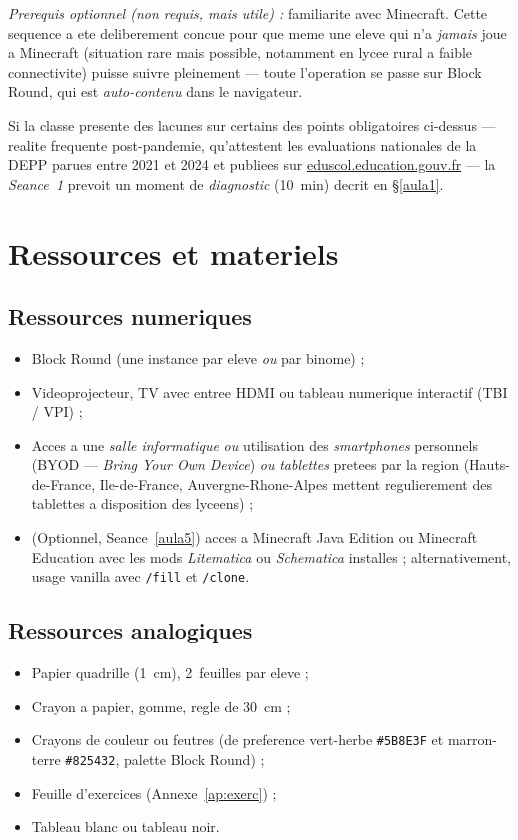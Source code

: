 \documentclass[12pt,a4paper]{scrartcl}
\newcommand{\cmd}[1]{\textcolor{earth}{\texttt{\small #1}}}
\begin{document}
\emph{Prerequis optionnel (non requis, mais utile) :} familiarite avec Minecraft. Cette sequence a ete deliberement concue pour que meme un\textperiodcentered e eleve qui n'a \emph{jamais} joue a Minecraft (situation rare mais possible, notamment en lycee rural a faible connectivite) puisse suivre pleinement --- toute l'operation se passe sur Block Round, qui est \emph{auto-contenu} dans le navigateur.

Si la classe presente des lacunes sur certains des points obligatoires ci-dessus --- realite frequente post-pandemie, qu'attestent les evaluations nationales de la DEPP parues entre 2021 et 2024 et publiees sur \href{https://www.education.gouv.fr/}{eduscol.education.gouv.fr} --- la \emph{Seance~1} prevoit un moment de \emph{diagnostic} (10~min) decrit en §\ref{aula1}.

\section{Ressources et materiels}\label{sec:recursos}

\subsection{Ressources numeriques}
\begin{itemize}[leftmargin=1.3em,itemsep=0.15em,topsep=0.3em]
  \item Block Round (une instance par eleve \emph{ou} par binome) ;
  \item Videoprojecteur, TV avec entree HDMI ou tableau numerique interactif (TBI / VPI) ;
  \item Acces a une \emph{salle informatique} \emph{ou} utilisation des \emph{smartphones} personnels (BYOD --- \emph{Bring Your Own Device}) \emph{ou} \emph{tablettes} pretees par la region (Hauts-de-France, Ile-de-France, Auvergne-Rhone-Alpes mettent regulierement des tablettes a disposition des lyceens) ;
  \item (Optionnel, Seance~\ref{aula5}) acces a Minecraft Java Edition ou Minecraft Education avec les mods \emph{Litematica} ou \emph{Schematica} installes ; alternativement, usage vanilla avec \cmd{/fill} et \cmd{/clone}.
\end{itemize}

\subsection{Ressources analogiques}
\begin{itemize}[leftmargin=1.3em,itemsep=0.15em,topsep=0.3em]
  \item Papier quadrille (1~cm), 2~feuilles par eleve ;
  \item Crayon a papier, gomme, regle de 30~cm ;
  \item Crayons de couleur ou feutres (de preference vert-herbe \texttt{\#5B8E3F} et marron-terre \texttt{\#825432}, palette Block Round) ;
  \item Feuille d'exercices (Annexe~\ref{ap:exerc}) ;
  \item Tableau blanc ou tableau noir.
\end{itemize}
\end{document}

